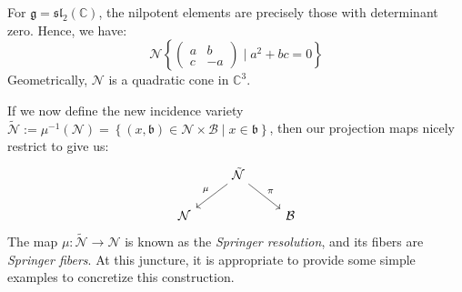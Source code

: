 \documentclass[11pt]{article}
\newcommand{\C}{\mathbb{C}}
\theoremstyle{definition}
\numberwithin{equation}{section} %
\begin{document}
\begin{example}
    For $\mathfrak{g} = \mathfrak{sl}_2(\C)$, the nilpotent elements are precisely those with determinant zero. Hence, we have:
    $$
    \mathcal{N} \left\{\begin{pmatrix} a & b \\ c & -a \end{pmatrix} \mid a^2+bc=0\right\}
    $$
    Geometrically, $\mathcal{N}$ is a quadratic cone in $\C^3$.
\end{example}

\noindent If we now define the new incidence variety $\tilde{\mathcal{N}} := \mu^{-1}(\mathcal{N}) = \left\{(x,\mathfrak{b})\in \mathcal{N}\times \mathcal{B}\mid x\in \mathfrak{b}\right\}$, then our projection maps nicely restrict to give us:
\[\begin{tikzcd}
	& {\tilde{\mathcal{N}}} & \\
	{\mathcal{N}} && {\mathcal{B}}
	\arrow["\mu"', from=1-2, to=2-1]
	\arrow["\pi", from=1-2, to=2-3]
\end{tikzcd}\]
The map $\mu:\tilde{\mathcal{N}}\to \mathcal{N}$ is known as the \emph{Springer resolution}, and its fibers are \emph{Springer fibers}. At this juncture, it is appropriate to provide some simple examples to concretize this construction. 
\end{document}
